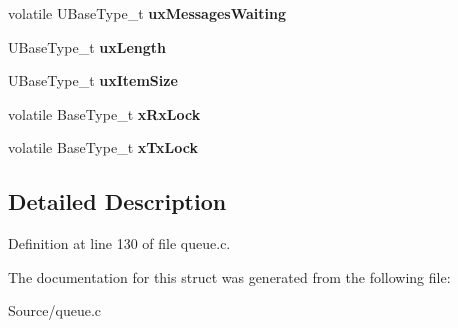 \begin{DoxyCompactItemize}
\item 
\hypertarget{struct_queue_definition_afb61b3f2247402ed3b8b159311c408b7}{}volatile U\+Base\+Type\+\_\+t {\bfseries ux\+Messages\+Waiting}\label{struct_queue_definition_afb61b3f2247402ed3b8b159311c408b7}

\item 
\hypertarget{struct_queue_definition_a619169da78e43281a73fbdf13f9eddfb}{}U\+Base\+Type\+\_\+t {\bfseries ux\+Length}\label{struct_queue_definition_a619169da78e43281a73fbdf13f9eddfb}

\item 
\hypertarget{struct_queue_definition_a216cc99516d7f82573f6cb19f5a9f626}{}U\+Base\+Type\+\_\+t {\bfseries ux\+Item\+Size}\label{struct_queue_definition_a216cc99516d7f82573f6cb19f5a9f626}

\item 
\hypertarget{struct_queue_definition_a4b64e89afe499402ab4c2e8f8ce73b8e}{}volatile Base\+Type\+\_\+t {\bfseries x\+Rx\+Lock}\label{struct_queue_definition_a4b64e89afe499402ab4c2e8f8ce73b8e}

\item 
\hypertarget{struct_queue_definition_a89f0f7b2578d1d12e7d33ad5b13e931a}{}volatile Base\+Type\+\_\+t {\bfseries x\+Tx\+Lock}\label{struct_queue_definition_a89f0f7b2578d1d12e7d33ad5b13e931a}

\end{DoxyCompactItemize}


\subsection{Detailed Description}


Definition at line 130 of file queue.\+c.



The documentation for this struct was generated from the following file\+:\begin{DoxyCompactItemize}
\item 
Source/queue.\+c\end{DoxyCompactItemize}
